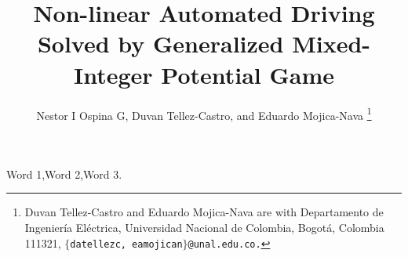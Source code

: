 \documentclass[letterpaper,10pt,conference,draftcls,onecolumn]{ieeeconf} %
\theoremstyle{plain}
\begin{document}
\title{\LARGE \bf   Non-linear Automated Driving Solved by Generalized Mixed-Integer Potential Game}

\author{Nestor I Ospina G, Duvan Tellez-Castro,
        and Eduardo Mojica-Nava
\thanks{Duvan Tellez-Castro and Eduardo Mojica-Nava are with Departamento de Ingenier\'ia El\'ectrica, Universidad Nacional de Colombia, Bogot\'a, Colombia 111321, $\{$\texttt{datellezc, eamojican$\}$@unal.edu.co.}}        
}        
 
\maketitle

\begin{abstract}

 
 
\end{abstract}
\begin{keywords}
	Word 1,Word 2,Word 3. %
\end{keywords}



 
 



%



\end{document}
